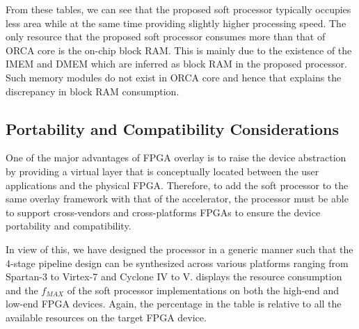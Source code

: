 From these tables, we can see that the proposed soft processor typically occupies less area while at the same time providing slightly higher processing speed. The only resource that the proposed soft processor consumes more than that of ORCA core is the on-chip block RAM. This is mainly due to the existence of the IMEM and DMEM which are inferred as block RAM in the proposed processor. Such memory modules do not exist in ORCA core and hence that explains the discrepancy in block RAM consumption.


\subsection{Portability and Compatibility Considerations}
One of the major advantages of FPGA overlay is to raise the device abstraction by providing a virtual layer that is conceptually located between the user applications and the physical FPGA. Therefore, to add the soft processor to the same overlay framework with that of the accelerator, the processor must be able to support cross-vendors and cross-platforms FPGAs to ensure the device portability and compatibility.

In view of this, we have designed the processor in a generic manner such that the 4-stage pipeline design can be synthesized across various platforms ranging from Spartan-3 to Virtex-7 and Cyclone IV to V.  displays the resource consumption and the $f_{MAX}$ of the soft processor implementations on both the high-end and low-end FPGA devices. Again, the percentage in the table is relative to all the available resources on the target FPGA device.



